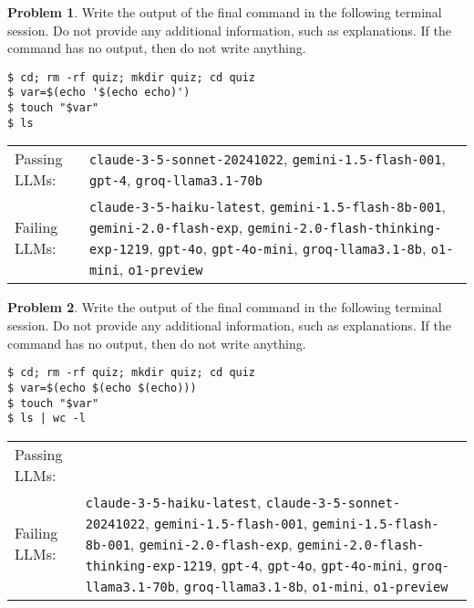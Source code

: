 \documentclass[10pt]{article}
\theoremstyle{definition}
\newtheorem{problem}{Problem}
\begin{document}
\begin{samepage}

\begin{problem}
Write the output of the final command in the following terminal session.
Do not provide any additional information,
such as explanations.
If the command has no output,
then do not write anything.

\end{problem}
\begin{lstlisting}
$ cd; rm -rf quiz; mkdir quiz; cd quiz
$ var=$(echo '$(echo echo)')
$ touch "$var"
$ ls
\end{lstlisting}


\noindent
\begin{tabular}{p{1.0in}L{5in}}
Passing LLMs: & {\lstinline$claude-3-5-sonnet-20241022$}, {\lstinline$gemini-1.5-flash-001$}, {\lstinline$gpt-4$}, {\lstinline$groq-llama3.1-70b$} \\
Failing LLMs: & {\lstinline$claude-3-5-haiku-latest$}, {\lstinline$gemini-1.5-flash-8b-001$}, {\lstinline$gemini-2.0-flash-exp$}, {\lstinline$gemini-2.0-flash-thinking-exp-1219$}, {\lstinline$gpt-4o$}, {\lstinline$gpt-4o-mini$}, {\lstinline$groq-llama3.1-8b$}, {\lstinline$o1-mini$}, {\lstinline$o1-preview$} \\
\end{tabular}

\end{samepage}
\begin{samepage}

\begin{problem}
Write the output of the final command in the following terminal session.
Do not provide any additional information,
such as explanations.
If the command has no output,
then do not write anything.

\end{problem}
\begin{lstlisting}
$ cd; rm -rf quiz; mkdir quiz; cd quiz
$ var=$(echo $(echo $(echo)))
$ touch "$var"
$ ls | wc -l
\end{lstlisting}


\noindent
\begin{tabular}{p{1.0in}L{5in}}
Passing LLMs: &  \\
Failing LLMs: & {\lstinline$claude-3-5-haiku-latest$}, {\lstinline$claude-3-5-sonnet-20241022$}, {\lstinline$gemini-1.5-flash-001$}, {\lstinline$gemini-1.5-flash-8b-001$}, {\lstinline$gemini-2.0-flash-exp$}, {\lstinline$gemini-2.0-flash-thinking-exp-1219$}, {\lstinline$gpt-4$}, {\lstinline$gpt-4o$}, {\lstinline$gpt-4o-mini$}, {\lstinline$groq-llama3.1-70b$}, {\lstinline$groq-llama3.1-8b$}, {\lstinline$o1-mini$}, {\lstinline$o1-preview$} \\
\end{tabular}

\end{samepage}
\end{document}
